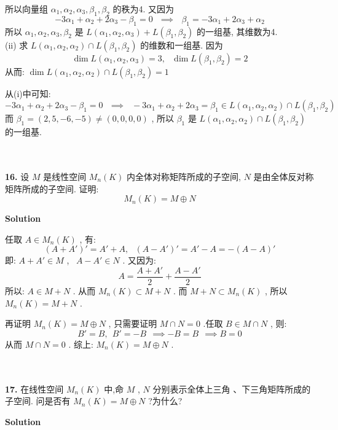 \documentclass[11pt,a4paper,openany,oneside]{book}
\newcommand\Solution{\noindent\textbf{\textsf{Solution}}\par\medskip}
\begin{document}
所以向量组 $ \alpha_1, \alpha_2, \alpha_3, \beta_1, \beta_2 $ 的秩为4. 又因为
 $$   -3\alpha_1 + \alpha_2 + 2\alpha_3 -\beta_1 = 0 \ \ \ \implies \ \ \ \beta_1 = -3\alpha_1 + 2\alpha_3 + \alpha_2  $$ 
所以 $ \alpha_1, \alpha_2, \alpha_3, \beta_2 $ 是 $ L(\alpha_1, \alpha_2, \alpha_3) + L(\beta_1, \beta_2) $ 的一组基, 其维数为4.  \\

(ii) 求 $ L(\alpha_1, \alpha_2, \alpha_2) \cap L(\beta_1, \beta_2) $ 的维数和一组基. 因为
 $$  \dim L(\alpha_1, \alpha_2, \alpha_3) = 3, \ \ \ \dim L(\beta_1, \beta_2) = 2  $$ 
从而:  $ \dim L(\alpha_1, \alpha_2, \alpha_2) \cap L(\beta_1, \beta_2) = 1 $ 

从(i)中可知:
 $$  -3\alpha_1 + \alpha_2 + 2\alpha_3 -\beta_1 = 0 \ \ \ \implies \ \ \ -3\alpha_1 + \alpha_2 + 2\alpha_3 = \beta_1 \in L(\alpha_1, \alpha_2, \alpha_2) \cap L(\beta_1, \beta_2)  $$ 
\hspace{3.3em} 而  $ \beta_1 = (2, 5, -6, -5) \neq (0, 0, 0, 0) $ , 所以 $ \beta_1 $ 是 $ L(\alpha_1, \alpha_2, \alpha_2) \cap L(\beta_1, \beta_2) $ 的一组基.  \\  \\  \\



\begin{myexample}
	\textbf{16.} 
设 $ M $ 是线性空间 $ M_n(K) $ 内全体对称矩阵所成的子空间,  $ N $ 是由全体反对称矩阵所成的子空间. 证明:
 $$  M_n(K) = M \oplus  N  $$ 
\end{myexample}
\Solution

任取 $ A \in M_n(K) $ , 有:
 $$  (A + A')' = A' + A , \ \ \ (A - A')' = A' - A  = -(A - A)'   $$ 
\hspace{3em} 即:  $ A + A' \in M $ , \  $ A - A' \in N $ . 又因为:
 $$  A = \dfrac{A+A'}{2} + \dfrac{A - A'}{2}  $$ 
所以: $ A \in M + N $ . 从而 $ M_n(K) \subset M + N $ . 而 $ M + N \subset M_n(K) $ , 所以  $ M_n(K) = M + N $ . 

再证明 $ M_n(K) = M \oplus  N $ , 只需要证明 $ M \cap N = 0 $ .任取 $ B \in M \cap N $ , 则:
 $$  B' = B, \ \ B' = -B \ \ \implies -B = B \ \ \implies B = 0  $$ 
\hspace{3em} 从而 $ M \cap N = 0 $ . 综上:  $ M_n(K) = M \oplus  N $ .  \\  \\ \\


\begin{myexample}
	\textbf{17.} 
在线性空间 $ M_n(K) $ 中,命 $ M $ ,  $ N $ 分别表示全体上三角 、下三角矩阵所成的子空间. 问是否有 $ M_n(K) = M \oplus  N $ ?为什么?   \\ 

\end{myexample}
\Solution
\end{document}
